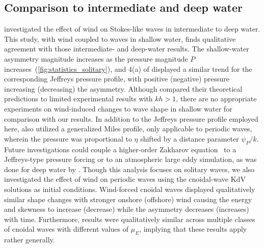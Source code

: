 \documentclass{jfm}
\begin{document}
\subsection{\label{sec:comparison} Comparison to intermediate and deep water}
 investigated the effect of
wind on Stokes-like waves in intermediate to deep water.
This study, with wind coupled to waves in shallow water, finds
qualitative agreement with those intermediate- and deep-water results.
The shallow-water asymmetry magnitude increases as the pressure
magnitude $P$ increases~(\cref{fig:statistics_solitary}), and \figname{}
4(a) of \citet{zdyrski2020wind} displayed a similar trend for the
corresponding Jeffreys pressure profile, with positive (negative)
pressure increasing (decreasing) the asymmetry.
Although \citet{zdyrski2020wind} compared their theoretical
predictions to limited experimental results with $kh > 1$, there are no
appropriate experiments on wind-induced changes to wave shape in shallow
water for comparison with our results.
In addition to the Jeffreys pressure profile employed here,
\citet{zdyrski2020wind} also utilized a generalized Miles profile,
only applicable to periodic waves, wherein the pressure was proportional
to $\eta$ shifted by a distance parameter $\psi_P/k$.
Future investigations could couple a higher-order Zakharov
equation~\citep[\eg][]{dommermuth1987high} to a Jeffreys-type pressure
forcing or to an atmospheric large eddy simulation, as was done for deep
water by \citet{hao2019wind}.
Though this analysis focuses on solitary waves, we also investigated the
effect of wind on periodic waves using the cnoidal-wave KdV solutions as
initial conditions.
Wind-forced cnoidal waves displayed qualitatively similar shape changes
with stronger onshore (offshore) wind causing the energy and skewness to
increase (decrease) while the asymmetry decreases (increases) with time.
Furthermore, results were qualitatively similar across multiple classes
of cnoidal waves with different values of $\mu_E$, implying that these
results apply rather generally.
\end{document}
